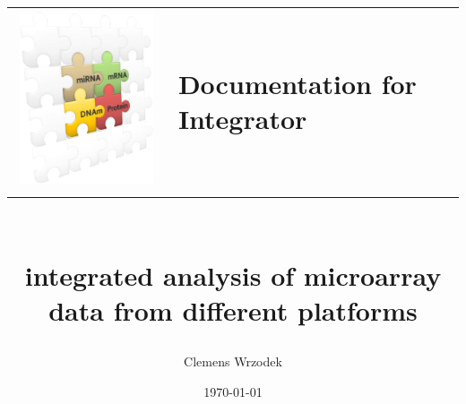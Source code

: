 \documentclass[
  BCOR12mm,
  letterpaper,
  11pt,
  headsepline,
  pointlessnumbers,
  tablecaptionabove,
  onelinecaption,
  headinclude,
  appendixprefix,
  idxtotoc,
  bibtotoc,
  twoside,
  titlepage
]{scrreprt}
\title{
\centering
\begin{tabular}{C{5cm}L{5cm}}
\includegraphics[width=0.35\columnwidth]{figures/puzzle_logo.png} & Documentation for Integrator \\
\end{tabular}
\\ \vspace{5mm} \large{integrated analysis of microarray data from different platforms}\\
}
\author{Clemens Wrzodek}
\date{\today}
\begin{document}

\maketitle
\begin{abstract}

\end{abstract}

\setcounter{tocdepth}{1}
\tableofcontents		%

\cleardoublepage		%











\end{document}
